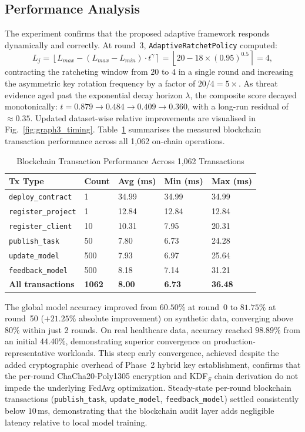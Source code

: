 \documentclass[journal, 10pt, twocolumn]{IEEEtran}
\begin{document}
\subsection{Performance Analysis}
The experiment confirms that the proposed adaptive framework responds dynamically and correctly. At round~3, \texttt{AdaptiveRatchetPolicy} computed:
\begin{equation}
L_j = \left\lfloor L_{max} - (L_{max} - L_{min}) \cdot t^{\gamma} \right\rceil
= \left\lfloor 20 - 18 \times (0.95)^{0.5} \right\rceil = 4,
\end{equation}
contracting the ratcheting window from $20$ to $4$ in a single round and increasing the asymmetric key rotation frequency by a factor of $20/4 = 5\times$. As threat evidence aged past the exponential decay horizon $\lambda$, the composite score decayed monotonically: $t = 0.879 \to 0.484 \to 0.409 \to 0.360$, with a long-run residual of $\approx 0.35$. Updated dataset-wise relative improvements are visualised in Fig.~\ref{fig:graph3_timing}. Table~\ref{tab:blockchain_perf} summarises the measured blockchain transaction performance across all 1,062 on-chain operations.
\begin{table}
\centering
\caption{Blockchain Transaction Performance Across 1,062 Transactions}
\label{tab:blockchain_perf}
\begin{tabular}{l l l l l}
\toprule
\textbf{Tx Type} & \textbf{Count} & \textbf{Avg (ms)} & \textbf{Min (ms)} & \textbf{Max (ms)} \\
\midrule
\texttt{deploy\_contract}  & 1    & 34.99 & 34.99 & 34.99 \\
\texttt{register\_project} & 1    & 12.84 & 12.84 & 12.84 \\
\texttt{register\_client}  & 10   & 10.31 & 7.95  & 20.31 \\
\texttt{publish\_task}     & 50   & 7.80  & 6.73  & 24.28 \\
\texttt{update\_model}     & 500  & 7.93  & 6.97  & 25.64 \\
\texttt{feedback\_model}   & 500  & 8.18  & 7.14  & 31.21 \\
\midrule
\textbf{All transactions}  & \textbf{1062} & \textbf{8.00} & \textbf{6.73} & \textbf{36.48} \\
\bottomrule
\end{tabular}
\end{table}

The global model accuracy improved from $60.50\%$ at round~0 to $\mathbf{81.75\%}$ at round~50 ($+21.25\%$ absolute improvement) on synthetic data, converging above $80\%$ within just 2 rounds. On real healthcare data, accuracy reached $\mathbf{98.89\%}$ from an initial 44.40\%, demonstrating superior convergence on production-representative workloads. This steep early convergence, achieved despite the added cryptographic overhead of Phase~2 hybrid key establishment, confirms that the per-round ChaCha20-Poly1305 encryption and KDF$_S$ chain derivation do not impede the underlying FedAvg optimization. Steady-state per-round blockchain transactions (\texttt{publish\_task}, \texttt{update\_model}, \texttt{feedback\_model}) settled consistently below $10$\,ms, demonstrating that the blockchain audit layer adds negligible latency relative to local model training.
\end{document}
